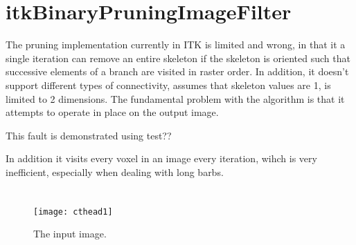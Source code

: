 \documentclass{InsightArticle}
\begin{document}
\section{itkBinaryPruningImageFilter}
The pruning implementation currently in ITK is limited and wrong, in
that it a single iteration can remove an entire skeleton if the
skeleton is oriented such that successive elements of a branch are
visited in raster order. In addition, it doesn't support different
types of connectivity, assumes that skeleton values are 1, is limited
to 2 dimensions. The fundamental problem with the algorithm is that it
attempts to operate in place on the output image.

This fault is demonstrated using test??

In addition it visits every voxel in an image every iteration, wihch
is very inefficient, especially when dealing with long barbs.

\section{}







\begin{figure}[htbp]
\centering
\texttt{[image: cthead1]}
\caption{The input image.\label{cthead1}}
\end{figure}


\appendix





\nocite{ITKSoftwareGuide}
\end{document}
